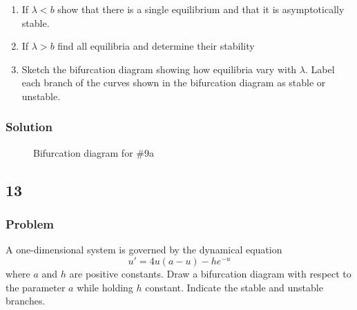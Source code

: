 \documentclass[12pt]{article}
\begin{document}
\begin{enumerate}
\item If $\lambda < b$  show that there is a single equilibrium and that it is
  asymptotically stable.
\item If $\lambda > b$ find all equilibria and determine their stability
\item Sketch the bifurcation diagram showing how equilibria vary with $\lambda$.
  Label each branch of the curves shown in the bifurcation diagram as stable or
  unstable.
\end{enumerate}

\subsubsection*{Solution}
\todo[]

\begin{figure}
  \centering
  \caption{Bifurcation diagram for \#9a}
  \label{fig:9-bifurcation-diagram}
\end{figure}

\subsection{13}
\subsubsection*{Problem}
A one-dimensional system is governed by the dynamical equation
\begin{equation}
  \label{eq:13-problem}
  u'=4u(a-u)-he^{-u}
\end{equation}
where $a$ and $h$ are positive constants. Draw a bifurcation diagram with
respect to the parameter $a$ while holding $h$ constant. Indicate the stable and
unstable branches.
\end{document}
